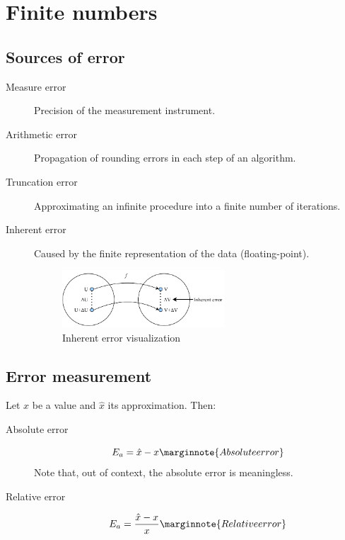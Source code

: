 \section{Finite numbers}



\subsection{Sources of error}

\begin{description}
    \item[Measure error] 
        Precision of the measurement instrument.

    \item[Arithmetic error] 
        Propagation of rounding errors in each step of an algorithm.

    \item[Truncation error] 
        Approximating an infinite procedure into a finite number of iterations.

    \item[Inherent error] 
        Caused by the finite representation of the data (floating-point).
        \begin{figure}[h]
            \centering
            \includegraphics[width=0.6\textwidth]{img/_inherent_error.pdf}
            \caption{Inherent error visualization}
        \end{figure}
\end{description}



\subsection{Error measurement}

Let $x$ be a value and $\hat{x}$ its approximation. Then:
\begin{description}
    \item[Absolute error] 
        \begin{equation}
            E_{a} = \hat{x} - x 
            \marginnote{Absolute error}
        \end{equation} 
        Note that, out of context, the absolute error is meaningless.
    \item[Relative error] 
        \begin{equation}
            E_{a} = \frac{\hat{x} - x}{x} 
            \marginnote{Relative error}
        \end{equation} 
\end{description}



